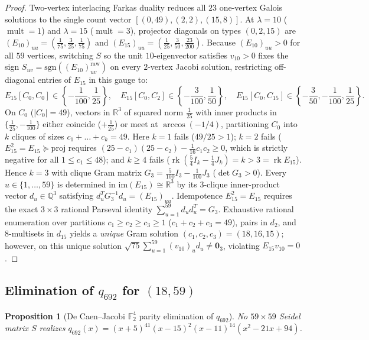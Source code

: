 \documentclass[11pt,reqno]{amsart}
\newtheorem{proposition}[theorem]{Proposition}
\theoremstyle{definition}
\theoremstyle{remark}
\numberwithin{equation}{section}
\numberwithin{table}{section}
\DeclareMathOperator{\rk}{rk}
\DeclareMathOperator{\mult}{mult}
\begin{document}
\begin{proof}
Two-vertex interlacing Farkas duality reduces all $23$ one-vertex Galois solutions to the single count vector $[(0, 49), (2, 2), (15, 8)]$. At $\lambda = 10$ ($\mult = 1$) and $\lambda = 15$ ($\mult = 3$), projector diagonals on types $(0, 2, 15)$ are $(E_{10})_{uu} = (\frac{1}{75}, \frac{3}{25}, \frac{1}{75})$ and $(E_{15})_{uu} = (\frac{1}{25}, \frac{3}{50}, \frac{23}{200})$. Because $(E_{10})_{uu} > 0$ for all $59$ vertices, switching $S$ so the unit $10$-eigenvector satisfies $v_{10} > 0$ fixes the sign $S_{uv} = \mathrm{sgn}((E_{10})_{uv}^{\mathrm{raw}})$ on every $2$-vertex Jacobi solution, restricting off-diagonal entries of $E_{15}$ in this gauge to:
\[
  E_{15}[C_0, C_0] \in \left\{-\frac{1}{100}, \frac{1}{25}\right\}, \quad
  E_{15}[C_0, C_2] \in \left\{-\frac{3}{100}, \frac{1}{50}\right\}, \quad
  E_{15}[C_0, C_{15}] \in \left\{-\frac{3}{50}, -\frac{1}{100}, \frac{1}{25}\right\}.
\]
On $C_0$ ($|C_0| = 49$), vectors in $\mathbb{R}^3$ of squared norm $\frac{1}{25}$ with inner products in $\{\frac{1}{25}, -\frac{1}{100}\}$ either coincide ($+\frac{1}{25}$) or meet at $\arccos(-1/4)$, partitioning $C_0$ into $k$ cliques of sizes $c_1 + \dots + c_k = 49$. Here $k = 1$ fails ($49/25 > 1$); $k = 2$ fails ($E_{15}^2 = E_{15} \succeq \mathrm{proj}$ requires $(25-c_1)(25-c_2) - \frac{1}{16}c_1 c_2 \ge 0$, which is strictly negative for all $1 \le c_1 \le 48$); and $k \ge 4$ fails ($\rk(\frac{5}{4}I_k - \frac{1}{4}J_k) = k > 3 = \rk E_{15}$). Hence $k = 3$ with clique Gram matrix $G_3 = \frac{5}{100}I_3 - \frac{1}{100}J_3$ ($\det G_3 > 0$). Every $u \in \{1, \dots, 59\}$ is determined in $\mathrm{im}(E_{15}) \cong \mathbb{R}^3$ by its $3$-clique inner-product vector $d_u \in \mathbb{Q}^3$ satisfying $d_u^T G_3^{-1} d_u = (E_{15})_{uu}$. Idempotence $E_{15}^2 = E_{15}$ requires the exact $3 \times 3$ rational Parseval identity $\sum_{u=1}^{59} d_u d_u^T = G_3$. Exhaustive rational enumeration over partitions $c_1 \ge c_2 \ge c_3 \ge 1$ ($c_1+c_2+c_3=49$), pairs in $d_2$, and $8$-multisets in $d_{15}$ yields a \emph{unique} Gram solution $(c_1, c_2, c_3) = (18, 16, 15)$; however, on this unique solution $\sqrt{75}\sum_{u=1}^{59} (v_{10})_u d_u \neq \mathbf{0}_3$, violating $E_{15} v_{10} = 0$.
\end{proof}

\subsection{Elimination of \texorpdfstring{$q_{692}$}{q\_692} for \texorpdfstring{$(18, 59)$}{(18, 59)}}
\begin{proposition}[De Caen--Jacobi $\mathbb{F}_2^4$ parity elimination of $q_{692}$]\label{prop:kill692}
No $59 \times 59$ Seidel matrix $S$ realizes $q_{692}(x) = (x + 5)^{41}(x - 15)^2(x - 11)^{14}(x^2 - 21x + 94)$.
\end{proposition}
\end{document}
